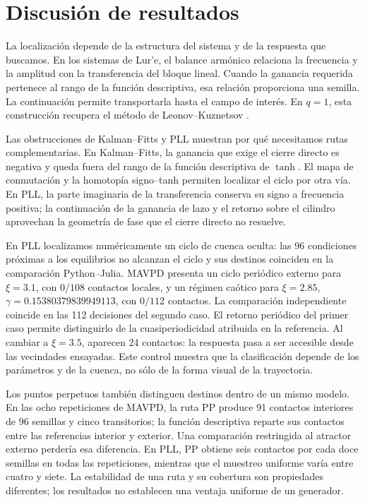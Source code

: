 \section{Discusión de resultados}
\label{sec:discusion}

La localización depende de la estructura del sistema y de la respuesta que
buscamos. En los sistemas de Lur'e, el balance armónico relaciona la
frecuencia y la amplitud con la transferencia del bloque lineal. Cuando la
ganancia requerida pertenece al rango de la función descriptiva, esa
relación proporciona una semilla. La continuación permite transportarla
hasta el campo de interés. En \(q=1\), esta construcción recupera el método
de Leonov--Kuznetsov \cite{LeonovKuznetsov2013,KuznetsovEtAl2017}.

Las obstrucciones de Kalman--Fitts y PLL muestran por qué necesitamos rutas
complementarias. En Kalman--Fitts, la ganancia que exige el cierre directo
es negativa y queda fuera del rango de la función descriptiva de \(\tanh\).
El mapa de conmutación y la homotopía signo--tanh permiten localizar el
ciclo por otra vía. En PLL, la parte imaginaria de la transferencia
conserva su signo a frecuencia positiva; la continuación de la ganancia
de lazo y el retorno sobre el cilindro aprovechan la geometría de fase
que el cierre directo no resuelve.

En PLL localizamos numéricamente un ciclo de cuenca oculta: las 96
condiciones próximas a los equilibrios no alcanzan el ciclo y sus destinos
coinciden en la comparación Python--Julia. MAVPD presenta un ciclo periódico
externo para \(\xi=3.1\), con \(0/108\) contactos locales, y un régimen
caótico para \(\xi=2.85\), \(\gamma=0.15380379839949113\), con
\(0/112\) contactos. La comparación independiente coincide en las 112
decisiones del segundo caso. El retorno periódico del primer caso permite
distinguirlo de la cuasiperiodicidad atribuida en la referencia. Al cambiar
a \(\xi=3.5\), aparecen 24 contactos: la respuesta pasa a ser accesible
desde las vecindades ensayadas. Este control muestra que la clasificación
depende de los parámetros y de la cuenca, no sólo de la forma visual de
la trayectoria.

Los puntos perpetuos también distinguen destinos dentro de un mismo
modelo. En las ocho repeticiones de MAVPD, la ruta PP produce 91 contactos
interiores de 96 semillas y cinco transitorios; la función descriptiva
reparte sus contactos entre las referencias interior y exterior. Una
comparación restringida al atractor externo perdería esa diferencia.
En PLL, PP obtiene seis contactos por cada doce semillas en todas las
repeticiones, mientras que el muestreo uniforme varía entre cuatro y siete.
La estabilidad de una ruta y su cobertura son propiedades diferentes; los
resultados no establecen una ventaja uniforme de un generador.

